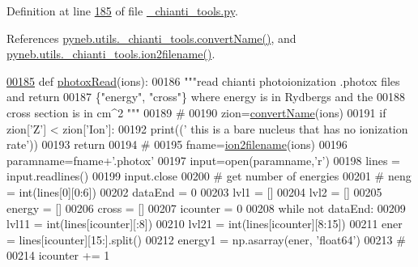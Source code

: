 Definition at line \hyperlink{__chianti__tools_8py_source_l00185}{185} of file \hyperlink{__chianti__tools_8py_source}{\+\_\+chianti\+\_\+tools.\+py}.



References \hyperlink{__chianti__tools_8py_source_l00353}{pyneb.\+utils.\+\_\+chianti\+\_\+tools.\+convert\+Name()}, and \hyperlink{__chianti__tools_8py_source_l00396}{pyneb.\+utils.\+\_\+chianti\+\_\+tools.\+ion2filename()}.


\begin{DoxyCode}
\hypertarget{namespacepyneb_1_1utils_1_1__chianti__tools_l00185}{}\hyperlink{namespacepyneb_1_1utils_1_1__chianti__tools_ac5c830808b3221d5f11b3e2d83b6140d}{00185} \textcolor{keyword}{def }\hyperlink{namespacepyneb_1_1utils_1_1__chianti__tools_ac5c830808b3221d5f11b3e2d83b6140d}{photoxRead}(ions):
00186     \textcolor{stringliteral}{"""read chianti photoionization .photox files and return}
00187 \textcolor{stringliteral}{        \{"energy", "cross"\} where energy is in Rydbergs and the}
00188 \textcolor{stringliteral}{        cross section is in cm^2  """}
00189     \textcolor{comment}{#}
00190     zion=\hyperlink{namespacepyneb_1_1utils_1_1__chianti__tools_a92cf299ad3407ee8923739e2761ab13f}{convertName}(ions)
00191     \textcolor{keywordflow}{if} zion[\textcolor{stringliteral}{'Z'}] < zion[\textcolor{stringliteral}{'Ion'}]:
00192         print((\textcolor{stringliteral}{' this is a bare nucleus that has no ionization rate'}))
00193         \textcolor{keywordflow}{return}
00194     \textcolor{comment}{#}
00195     fname=\hyperlink{namespacepyneb_1_1utils_1_1__chianti__tools_ad4bc7b577fd4c3819ceb00b0a444351b}{ion2filename}(ions)
00196     paramname=fname+\textcolor{stringliteral}{'.photox'}
00197     input=open(paramname,\textcolor{stringliteral}{'}\textcolor{stringliteral}{r')}
00198 \textcolor{stringliteral}{    lines = input.readlines()}
00199 \textcolor{stringliteral}{    input.close}
00200 \textcolor{stringliteral}{    }\textcolor{comment}{# get number of energies}
00201 \textcolor{comment}{#    neng = int(lines[0][0:6])}
00202     dataEnd = 0
00203     lvl1 = []
00204     lvl2 = []
00205     energy = []
00206     cross = []
00207     icounter = 0
00208     \textcolor{keywordflow}{while} \textcolor{keywordflow}{not} dataEnd:
00209         lvl11 = int(lines[icounter][:8])
00210         lvl21 = int(lines[icounter][8:15])
00211         ener = lines[icounter][15:].split()
00212         energy1 = np.asarray(ener, \textcolor{stringliteral}{'float64'})
00213         \textcolor{comment}{#}
00214         icounter += 1

\end{DoxyCode}
